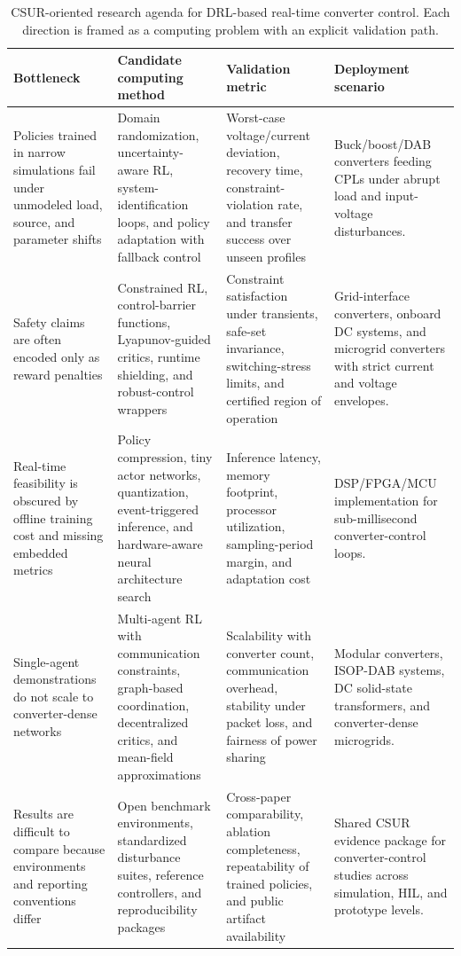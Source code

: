 \documentclass[manuscript,screen,review]{acmart}
\begin{document}
\begin{table}[t]
\caption{CSUR-oriented research agenda for DRL-based real-time converter control. Each direction is framed as a computing problem with an explicit validation path.}
\label{tab:research-agenda}
\begin{tabular}{p{}p{}p{}p{}}
\toprule
Bottleneck & Candidate computing method & Validation metric & Deployment scenario \\
\midrule
Policies trained in narrow simulations fail under unmodeled load, source, and parameter shifts & Domain randomization, uncertainty-aware RL, system-identification loops, and policy adaptation with fallback control & Worst-case voltage/current deviation, recovery time, constraint-violation rate, and transfer success over unseen profiles & Buck/boost/DAB converters feeding CPLs under abrupt load and input-voltage disturbances. \\
Safety claims are often encoded only as reward penalties & Constrained RL, control-barrier functions, Lyapunov-guided critics, runtime shielding, and robust-control wrappers & Constraint satisfaction under transients, safe-set invariance, switching-stress limits, and certified region of operation & Grid-interface converters, onboard DC systems, and microgrid converters with strict current and voltage envelopes. \\
Real-time feasibility is obscured by offline training cost and missing embedded metrics & Policy compression, tiny actor networks, quantization, event-triggered inference, and hardware-aware neural architecture search & Inference latency, memory footprint, processor utilization, sampling-period margin, and adaptation cost & DSP/FPGA/MCU implementation for sub-millisecond converter-control loops. \\
Single-agent demonstrations do not scale to converter-dense networks & Multi-agent RL with communication constraints, graph-based coordination, decentralized critics, and mean-field approximations & Scalability with converter count, communication overhead, stability under packet loss, and fairness of power sharing & Modular converters, ISOP-DAB systems, DC solid-state transformers, and converter-dense microgrids. \\
Results are difficult to compare because environments and reporting conventions differ & Open benchmark environments, standardized disturbance suites, reference controllers, and reproducibility packages & Cross-paper comparability, ablation completeness, repeatability of trained policies, and public artifact availability & Shared CSUR evidence package for converter-control studies across simulation, HIL, and prototype levels. \\
\bottomrule
\end{tabular}
\end{table}
\end{document}
